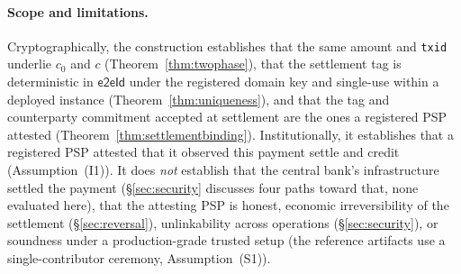 \documentclass[11pt]{article}
\newcommand{\eeid}{\ensuremath{\mathsf{e2eId}}}
\newcommand{\code}[1]{\texttt{#1}}
\begin{document}
\paragraph{Scope and limitations.}
Cryptographically, the construction establishes that the same amount and
\code{txid} underlie $c_0$ and $c$ (Theorem~\ref{thm:twophase}), that the
settlement tag is deterministic in \eeid{} under the registered domain key and
single-use within a deployed instance (Theorem~\ref{thm:uniqueness}), and that
the tag and counterparty commitment accepted at settlement are the ones a
registered PSP attested (Theorem~\ref{thm:settlementbinding}). Institutionally,
it establishes that a registered PSP attested that it observed this payment
settle and credit (Assumption~(I1)). It does \emph{not} establish that the
central bank's infrastructure settled the payment (\S\ref{sec:security}
discusses four paths toward that, none evaluated here), that the attesting PSP
is honest, economic irreversibility of the settlement (\S\ref{sec:reversal}),
unlinkability across operations (\S\ref{sec:security}), or soundness under a
production-grade trusted setup (the reference artifacts use a
single-contributor ceremony, Assumption~(S1)).
\end{document}
